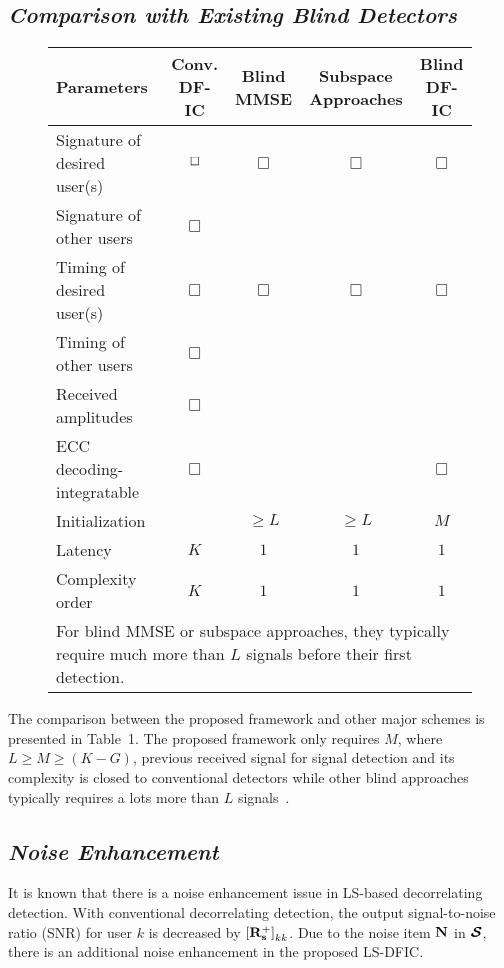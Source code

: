 \documentclass[a4paper,10pt,fleqn, twocolumn]{IEEETran}
\newcommand{\bs}{{\bf s}}
\newcommand{\bN}{{\bf N}}
\newcommand{\bR}{{\bf R}}
\newcommand{\bcS}{{\mbox {\boldmath ${\cal S}$}}}
\begin{document}
\subsection{\em Comparison with Existing Blind Detectors}
\begin{figure*}[t]\label{SchemComp}\small
{}
\begin{center}
\begin{tabular}{lcccc}
Parameters & Conv. DF-IC & Blind MMSE & Subspace Approaches & Blind DF-IC\\
\hline \hline
Signature of desired user(s) & $\bf\Box$ & $\mathbf\Box$ &  $\mathbf\Box$ & $\mathbf\Box$ \\
Signature of other users & $\mathbf\Box$ & &  \\
Timing of desired user(s)  & $\mathbf\Box$ & $\mathbf\Box$ & $\mathbf\Box$ & $\mathbf\Box$ \\
Timing of other users  & $\mathbf\Box$ & & & \\
Received amplitudes  & $\mathbf\Box$ & &  &\\
ECC decoding-integratable& $\mathbf\Box$ &&& $\mathbf\Box$ \\
Initialization~{\small *} &  & $\ge L$ & $\ge L$ & $M$\\
Latency & $K$ & $1$ & $1$ & $1$ \\
Complexity order & $K$ & $1$ & $1$ & $1$ \\
\hline \hline \multicolumn{5}{l}{\tiny * For blind MMSE or
subspace approaches, they typically require much more than $L$
signals before their first detection.}
\end{tabular}
\end{center}
\end{figure*}
The comparison between the proposed framework and other major
schemes is presented in Table~1. The proposed framework only
requires $M$, where $L\ge M\ge (K-G)$, previous received signal
for signal detection and its complexity is closed to conventional
detectors while other blind approaches typically requires a lots
more than $L$ signals~\cite{Madh94,Wang98,Zhang02}.
\subsection{\em Noise Enhancement}
It is known that there is a noise enhancement issue in LS-based
decorrelating detection. With conventional decorrelating
detection, the output signal-to-noise ratio (SNR) for user $k$ is
decreased by $\left[\bR_{\bs}^{+}\right]_{kk}$. Due to the noise
item $\bN$ in $\bcS$, there is an additional noise enhancement in
the proposed LS-DFIC.
\end{document}
